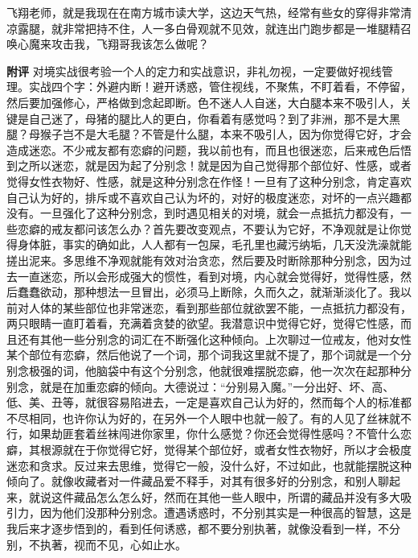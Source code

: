 \begin{case}
    飞翔老师，就是我现在在南方城市读大学，这边天气热，经常有些女的穿得非常清凉露腿，就非常把持不住，人一多白骨观就不见效，就连出门跑步都是一堆腿精召唤心魔来攻击我，飞翔哥我该怎么做呢？

    \textbf{附评} 对境实战很考验一个人的定力和实战意识，非礼勿视，一定要做好视线管理。实战四个字：外避内断！避开诱惑，管住视线，不聚焦，不盯着看，不停留，然后要加强修心，严格做到念起即断。色不迷人人自迷，大白腿本来不吸引人，关键是自己迷了，母猪的腿比人的更白，你看着有感觉吗？到了非洲，那不是大黑腿？母猴子岂不是大毛腿？不管是什么腿，本来不吸引人，因为你觉得它好，才会造成迷恋。不少戒友都有恋癖的问题，我以前也有，而且也很迷恋，后来戒色后悟到之所以迷恋，就是因为起了分别念！就是因为自己觉得那个部位好、性感，或者觉得女性衣物好、性感，就是这种分别念在作怪！一旦有了这种分别念，肯定喜欢自己认为好的，排斥或不喜欢自己认为坏的，对好的极度迷恋，对坏的一点兴趣都没有。一旦强化了这种分别念，到时遇见相关的对境，就会一点抵抗力都没有，一些恋癖的戒友都问该怎么办？首先要改变观点，不要认为它好，不净观就是让你觉得身体脏，事实的确如此，人人都有一包屎，毛孔里也藏污纳垢，几天没洗澡就能搓出泥来。多思维不净观就能有效对治贪恋，然后要及时断除那种分别念，因为过去一直迷恋，所以会形成强大的惯性，看到对境，内心就会觉得好，觉得性感，然后蠢蠢欲动，那种想法一旦冒出，必须马上断除，久而久之，就渐渐淡化了。我以前对人体的某些部位也非常迷恋，看到那些部位就欲罢不能，一点抵抗力都没有，两只眼睛一直盯着看，充满着贪婪的欲望。我潜意识中觉得它好，觉得它性感，而且还有其他一些分别念的词汇在不断强化这种倾向。上次聊过一位戒友，他对女性某个部位有恋癖，然后他说了一个词，那个词我这里就不提了，那个词就是一个分别念极强的词，他脑袋中有这个分别念，他就很难摆脱恋癖，他一次次在起那种分别念，就是在加重恋癖的倾向。大德说过：“分别易入魔。”一分出好、坏、高、低、美、丑等，就很容易陷进去，一定是喜欢自己认为好的，然而每个人的标准都不尽相同，也许你认为好的，在另外一个人眼中也就一般了。有的人见了丝袜就不行，如果劫匪套着丝袜闯进你家里，你什么感觉？你还会觉得性感吗？不管什么恋癖，其根源就在于你觉得它好，觉得某个部位好，或者女性衣物好，所以才会极度迷恋和贪求。反过来去思维，觉得它一般，没什么好，不过如此，也就能摆脱这种倾向了。就像收藏者对一件藏品爱不释手，对其有很多好的分别念，和别人聊起来，就说这件藏品怎么怎么好，然而在其他一些人眼中，所谓的藏品并没有多大吸引力，因为他们没那种分别念。遭遇诱惑时，不分别其实是一种很高的智慧，这是我后来才逐步悟到的，看到任何诱惑，都不要分别执著，就像没看到一样，不分别，不执著，视而不见，心如止水。
\end{case}


